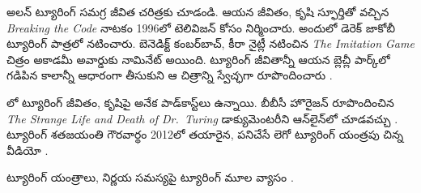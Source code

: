 \documentclass[../../../include/open-logic-section]{subfiles}
\begin{document}
\begin{reading}
అలన్ ట్యూరింగ్ సమగ్ర జీవిత చరిత్రకు \citet{Hodges2014} చూడండి. ఆయన జీవితం, కృషి స్ఫూర్తితో వచ్చిన \emph{Breaking the Code} నాటకం 1996లో టెలివిజన్ కోసం నిర్మించారు. అందులో డెరెక్ జాకోబీ ట్యూరింగ్ పాత్రలో నటించారు. బెనెడిక్ట్ కంబర్‌బాచ్, కీరా నైట్లీ నటించిన \emph{The Imitation Game} చిత్రం అకాడమీ అవార్డుకు నామినేట్ అయింది. ట్యూరింగ్ జీవితాన్నీ ఆయన బ్లెచ్లీ పార్క్‌లో గడిపిన కాలాన్నీ ఆధారంగా తీసుకుని ఆ చిత్రాన్ని స్వేచ్ఛగా రూపొందించారు \citep{Imitation2014}.

\citet{Radiolab2012}లో ట్యూరింగ్ జీవితం, కృషిపై అనేక పాడ్‌కాస్ట్‌లు ఉన్నాయి. బీబీసీ హొరైజన్ రూపొందించిన \emph{The Strange Life and Death of
  Dr.~Turing} డాక్యుమెంటరీని ఆన్‌లైన్‌లో చూడవచ్చు \citep{Sykes1992}. ట్యూరింగ్ శతజయంతి గౌరవార్థం 2012లో తయారైన, పనిచేసే లెగో ట్యూరింగ్ యంత్రపు చిన్న వీడియో \citep{Theelen2012}.

ట్యూరింగ్ యంత్రాలు, నిర్ణయ సమస్యపై ట్యూరింగ్ మూల వ్యాసం \citet{Turing1937}.
\end{reading}
\end{document}
